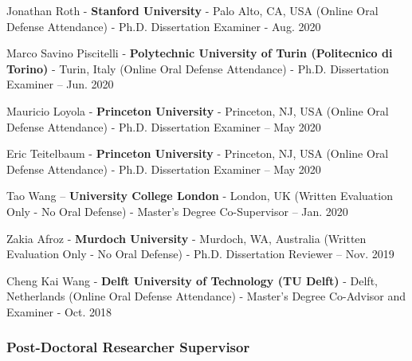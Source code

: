 \documentclass[10pt,a4paper]{article}
\begin{document}
\begin{small}
\begin{etaremune}
\item
Jonathan Roth - \textbf{Stanford University} - Palo Alto, CA, USA (Online Oral Defense Attendance) - Ph.D. Dissertation Examiner - Aug. 2020
\item
Marco Savino Piscitelli - \textbf{Polytechnic University of Turin (Politecnico di Torino)} - Turin, Italy (Online Oral Defense Attendance) - Ph.D. Dissertation Examiner – Jun. 2020
\item
Mauricio Loyola - \textbf{Princeton University} - Princeton, NJ, USA (Online Oral Defense Attendance) - Ph.D. Dissertation Examiner – May 2020
\item
Eric Teitelbaum - \textbf{Princeton University} - Princeton, NJ, USA (Online Oral Defense Attendance) - Ph.D. Dissertation Examiner – May 2020
\item 
Tao Wang – \textbf{University College London} - London, UK (Written Evaluation Only - No Oral Defense) -  Master’s Degree Co-Supervisor – Jan. 2020
\item
Zakia Afroz - \textbf{Murdoch University} - Murdoch, WA, Australia (Written Evaluation Only - No Oral Defense) -  Ph.D. Dissertation Reviewer – Nov. 2019 
\item
Cheng Kai Wang - \textbf{Delft University of Technology (TU Delft)} - Delft, Netherlands (Online Oral Defense Attendance) - Master's Degree Co-Advisor and Examiner - Oct. 2018
\end{etaremune}

\subsubsection*{Post-Doctoral Researcher Supervisor}



\end{small}
\end{document}
